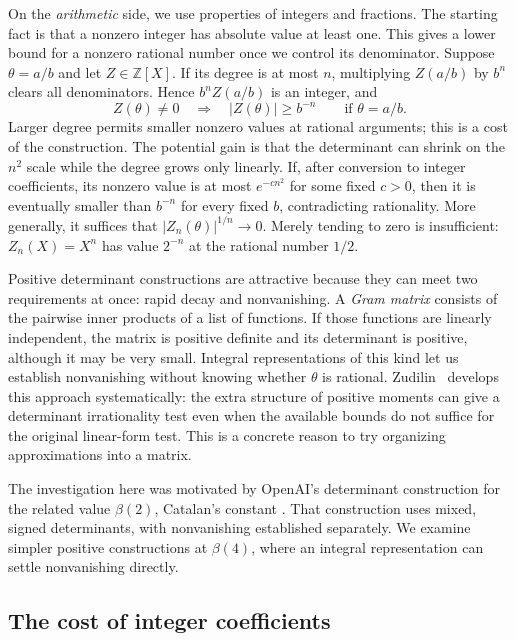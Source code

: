 \documentclass[11pt]{article}
\theoremstyle{definition}
\theoremstyle{remark}
\numberwithin{equation}{section}
\newcommand{\Z}{\mathbb Z}
\begin{document}
On the \emph{arithmetic} side, we use properties of integers and
fractions. The starting fact is that a nonzero integer has absolute
value at least one. This gives a lower bound for a nonzero rational
number once we control its denominator. Suppose $\theta=a/b$ and let
$Z\in\Z[X]$.
If its degree is at most $n$, multiplying $Z(a/b)$ by $b^n$ clears
all denominators. Hence $b^nZ(a/b)$ is an integer, and
\begin{equation}\label{eq:integer-test}
 Z(\theta)\ne0\quad\Longrightarrow\quad
 |Z(\theta)|\geq b^{-n}\qquad\text{if }\theta=a/b.
\end{equation}
Larger degree permits smaller nonzero values at rational arguments;
this is a cost of the construction. The potential gain is that the
determinant can shrink on the $n^2$ scale while the degree grows only
linearly. If, after conversion to integer coefficients, its nonzero
value is at most $e^{-cn^2}$ for some fixed $c>0$, then it is eventually
smaller than $b^{-n}$ for every fixed $b$, contradicting rationality.
More generally, it suffices that $|Z_n(\theta)|^{1/n}\to0$.
Merely tending to zero is insufficient:
$Z_n(X)=X^n$ has value $2^{-n}$ at the rational number $1/2$.

Positive determinant constructions are attractive because they can
meet two requirements at once: rapid decay and nonvanishing. A
\emph{Gram matrix} consists of the pairwise inner products of a list
of functions. If those functions are linearly independent, the matrix
is positive definite and its determinant is positive, although it may
be very small. Integral representations of this kind let us establish
nonvanishing without knowing whether $\theta$ is rational.
Zudilin~\cite[Proposition~2 and Section~2]{Zudilin} develops this approach
systematically: the extra structure of positive moments can give a
determinant irrationality test even when the available bounds do not
suffice for the original linear-form test. This is a concrete reason
to try organizing approximations into a matrix.

The investigation here was motivated by OpenAI's determinant construction
for the related value $\beta(2)$, Catalan's constant
\cite[Section~1.2]{OpenAI}. That construction uses mixed, signed
determinants, with nonvanishing established separately. We examine
simpler positive constructions at $\beta(4)$, where an integral
representation can settle nonvanishing directly.

\subsection{The cost of integer coefficients}
\end{document}
